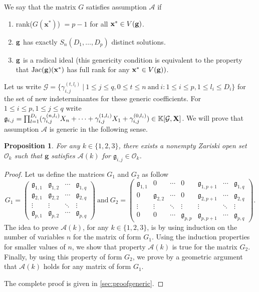 \documentclass[11pt]{article}
\numberwithin{Property}{section}
\numberwithin{Theorem}{section}
\newtheorem{Proposition}{Proposition}%
\numberwithin{Proposition}{section}
\numberwithin{Lemma}{section}
\numberwithin{Corollary}{section}
\numberwithin{Definition}{section}
\numberwithin{Remark}{section}
\numberwithin{Conjecture}{section}
\numberwithin{Problem}{section}
\numberwithin{Claim}{section}
\theoremstyle{definition}
\numberwithin{Example}{section}
\def\g {\ensuremath{\mathbf{g}}}
\renewcommand{\leq}{\leqslant}
\newcommand{\field}{\mathbb{K}} %
\newcommand{\improve}[1]{\textcolor{blue}{#1}} %
\begin{document}
We say that the matrix $G$ satisfies assumption $\mathcal{A}$ if 
\begin{enumerate}
\item rank($G(\mathbf{x}^*)$) $= p-1$ for all $\mathbf{x}^* \in V({\bf g})$.
\item ${\bf g}$ has exactly $S_{n}(D_1, \ldots, D_p)$ distinct solutions.  
\item ${\bf g}$ is a radical ideal (this genericity condition is equivalent to the property that $\mathrm{Jac}({\bf g})(\mathbf{x}^*)$ has full rank for any $\mathbf{x}^* \in V({\bf g}))$. 
\end{enumerate}

Let us write $\mathcal{G} = \{\gamma_{i,j}^{(t,l_i)} \ | \ 1 \leq j \leq q, 0 \leq t \leq n \ \mathrm{and} \ i : 1 \leq i \leq p, 1 \leq l_i \leq D_i\}$ for the set of new indeterminantes for these generic coefficients. For $1 \leq i \leq p, 1 \leq j \leq q$ write $\mathfrak{g}_{i,j} = \prod_{l=1}^{D_i}(\gamma_{i,j}^{(n,l_i)}X_n + \cdots + \gamma_{i,j}^{(1,l_i)}X_1 + \gamma_{i,j}^{(0,l_i)}) \in \field[\mathcal{G}, \bf{X}]$. We will prove that assumption $\mathcal{A}$ is generic in the following sense. 
\begin{Proposition} \label{generic}For any $k \in \{1,2,3\}$, there exists a nonempty Zariski open set $\mathcal{O}_k$ such that $\g$ satisfies $\mathcal{A}(k)$ for $\mathfrak{g}_{i,j} \in \mathcal{O}_k$. 
\end{Proposition}
\begin{proof}
Let us define the matrices $G_1$ and $G_2$ as follow
\[G_1 = \left( \begin{matrix}
\mathfrak{g}_{1,1} & \mathfrak{g}_{1,2} & \cdots  & \mathfrak{g}_{1, q}\\
\mathfrak{g}_{2,1} & \mathfrak{g}_{2,2} & \cdots  & \mathfrak{g}_{2, q}\\
\vdots & \vdots & \ddots & \vdots \\
\mathfrak{g}_{p,1} & \mathfrak{g}_{p,2} & \cdots  & \mathfrak{g}_{p, q}
\end{matrix} \right) \ \mathrm{and} \ 
 G_2 = \left( \begin{matrix}
\mathfrak{g}_{1,1} & 0 & \cdots & 0 & \mathfrak{g}_{1,p+1} & \cdots & \mathfrak{g}_{1, q}\\
0 & \mathfrak{g}_{2,2} & \cdots & 0 & \mathfrak{g}_{2,p+1} & \cdots & \mathfrak{g}_{2, q}\\
\vdots & \vdots & \ddots & \vdots & \vdots & \ddots & \vdots\\
0 & 0 & \cdots & \mathfrak{g}_{p,p} & \mathfrak{g}_{p,p+1} & \cdots & \mathfrak{g}_{p, q}
\end{matrix} \right). \] 
The idea to prove $\mathcal{A}(k)$, for any $k \in \{1,2,3\}$, is by using induction on the number of variables $n$ for the matrix of form $G_1$. Using the induction properties for smaller values of $n$, we show that property $\mathcal{A}(k)$ is true for the matrix $G_2$. Finally, by using this property of form $G_2$, we prove by a geometric argument that $\mathcal{A}(k)$ holds for any matrix of form $G_1$.

The complete proof is given in \improve{\cref{sec:proofgeneric}}. 
\end{proof}
\end{document}
